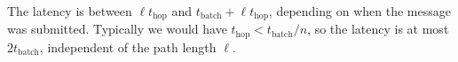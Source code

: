 \documentclass{llncs}
\begin{document}
The latency is between $\ell t_\mathrm{hop}$ and $t_\mathrm{batch} +
\ell t_\mathrm{hop}$, depending on when the message was submitted.
Typically we would have $t_\mathrm{hop} < t_\mathrm{batch}/n$, so the
latency is at most $2t_\mathrm{batch}$, independent of the path length
$\ell$.










\end{document}
